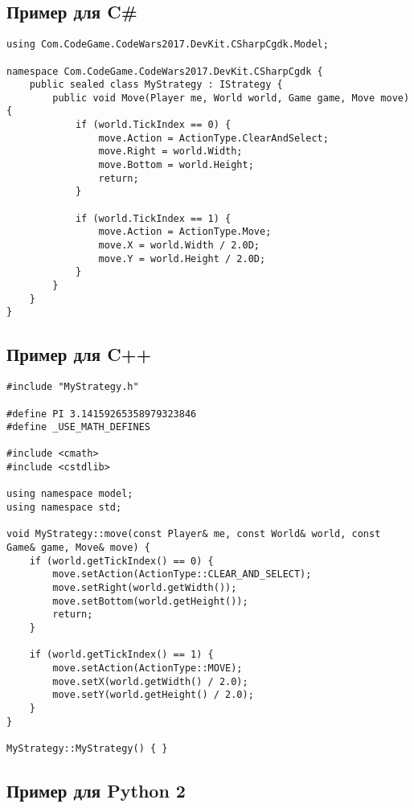 \subsection{Пример для C\#}

\begin{verbatim}
using Com.CodeGame.CodeWars2017.DevKit.CSharpCgdk.Model;

namespace Com.CodeGame.CodeWars2017.DevKit.CSharpCgdk {
    public sealed class MyStrategy : IStrategy {
        public void Move(Player me, World world, Game game, Move move) {
            if (world.TickIndex == 0) {
                move.Action = ActionType.ClearAndSelect;
                move.Right = world.Width;
                move.Bottom = world.Height;
                return;
            }

            if (world.TickIndex == 1) {
                move.Action = ActionType.Move;
                move.X = world.Width / 2.0D;
                move.Y = world.Height / 2.0D;
            }
        }
    }
}
\end{verbatim}

\newpage
\subsection{Пример для C++}

\begin{verbatim}
#include "MyStrategy.h"

#define PI 3.14159265358979323846
#define _USE_MATH_DEFINES

#include <cmath>
#include <cstdlib>

using namespace model;
using namespace std;

void MyStrategy::move(const Player& me, const World& world, const Game& game, Move& move) {
    if (world.getTickIndex() == 0) {
        move.setAction(ActionType::CLEAR_AND_SELECT);
        move.setRight(world.getWidth());
        move.setBottom(world.getHeight());
        return;
    }

    if (world.getTickIndex() == 1) {
        move.setAction(ActionType::MOVE);
        move.setX(world.getWidth() / 2.0);
        move.setY(world.getHeight() / 2.0);
    }
}

MyStrategy::MyStrategy() { }
\end{verbatim}

\newpage
\subsection{Пример для Python 2}

